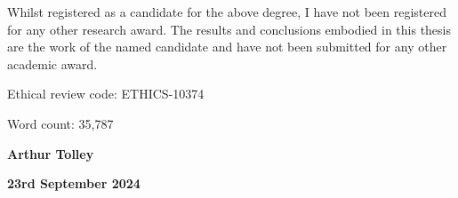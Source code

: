 Whilst registered as a candidate for the above degree, I have not been registered for any other research award. The results and conclusions embodied in this thesis are the work of the named candidate and have not been submitted for any other academic award.

\vspace{\baselineskip}
\noindent Ethical review code: ETHICS-10374

\vspace{\baselineskip}
\noindent Word count: 35,787

\noindent\hrulefill

\vspace{\baselineskip}
\noindent \textbf{Arthur Tolley}

\noindent \textbf{23rd September 2024}